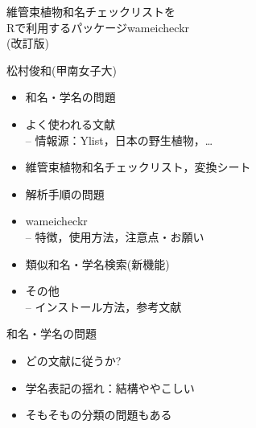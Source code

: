 \documentclass[
  a5paper,
  landscape,
  notitlepage]{report}
\author{}
\date{\vspace{-2.5em}}
\providecommand{\tightlist}{%
  \setlength{\itemsep}{0pt}\setlength{\parskip}{0pt}}
\begin{document}
\center

\fontsize{34pt}{34pt}\selectfont
\vspace{20pt}

維管束植物和名チェックリストを\\
Rで利用するパッケージwameicheckr\\
(改訂版)

\vspace{15pt}
\fontsize{22pt}{22pt}\selectfont

松村俊和(甲南女子大)

\vspace{20pt}

\begin{itemize}
\tightlist
\item
  和名・学名の問題\\
\item
  よく使われる文献\\
  -- 情報源：Ylist，日本の野生植物，\ldots{}\\
\item
  維管束植物和名チェックリスト，変換シート\\
\item
  解析手順の問題\\
\item
  wameicheckr\\
  -- 特徴，使用方法，注意点・お願い
\item
  類似和名・学名検索(新機能)\\
\item
  その他\\
  -- インストール方法，参考文献
\end{itemize}

\newpage
\fontsize{32pt}{32pt}\selectfont

\begin{center}
和名・学名の問題
\end{center}

\begin{itemize}
\tightlist
\item
  どの文献に従うか?\\
\item
  学名表記の揺れ：結構ややこしい\\
\item
  そもそもの分類の問題もある
\end{itemize}

\begin{center}
\downarrow   
\end{center}
\end{document}
